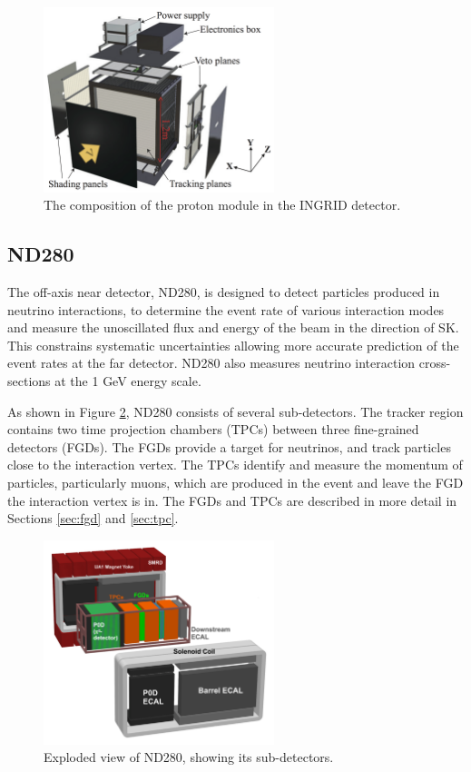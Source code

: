 \begin{figure}
\centering
\includegraphics*[width=0.6\textwidth,clip]{figs/protonmodule}
\caption{The composition of the proton module in the INGRID detector.} \label{protonmodule}
\end{figure}

\subsection{ND280}\label{sec:nd280}

The off-axis near detector, ND280, is designed to detect particles produced in neutrino interactions, to determine the event rate of various interaction modes and measure the unoscillated flux and energy of the beam in the direction of SK. This constrains systematic uncertainties allowing more accurate prediction of the event rates at the far detector. ND280 also measures neutrino interaction cross-sections at the 1 GeV energy scale. 

As shown in Figure \ref{nd280basket}, ND280 consists of several sub-detectors. The tracker region contains two time projection chambers (TPCs) between three fine-grained detectors (FGDs). The FGDs provide a target for neutrinos, and track particles close to the interaction vertex. The TPCs identify and measure the momentum of particles, particularly muons, which are produced in the event and leave the FGD the interaction vertex is in. The FGDs and TPCs are described in more detail in Sections \ref{sec:fgd} and \ref{sec:tpc}.

\begin{figure}
\centering
\includegraphics*[width=0.6\textwidth,clip]{figs/nd280basket}
\caption{Exploded view of ND280, showing its sub-detectors.} \label{nd280basket}
\end{figure}

